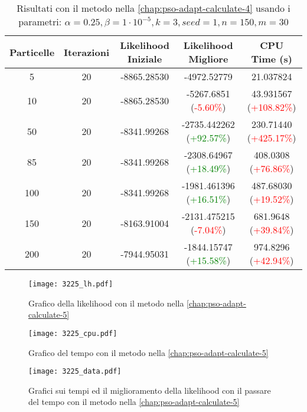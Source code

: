\begin{table}[!h]
  \centering
  \begin{tabular}{*{5}{c}}
    Particelle & Iterazioni & Likelihood Iniziale & Likelihood Migliore & CPU Time (s) \\ \midrule \midrule
    5 & 20 & -8865.28530 & -4972.52779 & 21.037824 \\
    10 & 20 & -8865.28530 & -5267.6851 (\textcolor{red}{-5.60\%}) & 43.931567 (\textcolor{red}{+108.82\%}) \\
    50 & 20 & -8341.99268 & -2735.442262 (\textcolor{green}{+92.57\%}) & 230.71440 (\textcolor{red}{+425.17\%}) \\
    85 & 20 & -8341.99268 & -2308.64967 (\textcolor{green}{+18.49\%}) & 408.0308 (\textcolor{red}{+76.86\%}) \\
    100 & 20 & -8341.99268 & -1981.461396 (\textcolor{green}{+16.51\%}) & 487.68030 (\textcolor{red}{+19.52\%}) \\
    150 & 20 & -8163.91004 & -2131.475215 (\textcolor{red}{-7.04\%}) & 681.9648 (\textcolor{red}{+39.84\%}) \\
    200 & 20 & -7944.95031 & -1844.15747 (\textcolor{green}{+15.58\%}) & 974.8296 (\textcolor{red}{+42.94\%}) \\
  \end{tabular}
  \caption{Risultati con il metodo nella \autoref{chap:pso-adapt-calculate-4} usando i parametri: $\alpha = 0.25, \beta = 1\cdot 10^{-5}, k = 3, seed = 1, n = 150, m = 30$}
  \label{tab:pso-adapt-calculate-5-table}
\end{table}

\begin{figure}[!h]
  \centering
  \begin{minipage}{.45 \textwidth}
  \centering
  \texttt{[image: 3225\_lh.pdf]}
  \caption{Grafico della likelihood con il metodo nella \autoref{chap:pso-adapt-calculate-5}}
  \end{minipage}
  \begin{minipage}{.45 \textwidth}
    \centering
    \texttt{[image: 3225\_cpu.pdf]}
    \caption{Grafico del tempo con il metodo nella \autoref{chap:pso-adapt-calculate-5}}
  \end{minipage}
  \label{fig:pso-adapt-calculate-1-graph}
\end{figure}

\begin{figure}[!h]
  \centering
  \texttt{[image: 3225\_data.pdf]}
  \caption{Grafici sui tempi ed il miglioramento della likelihood con il passare del tempo con il metodo nella \autoref{chap:pso-adapt-calculate-5}}
  \label{fig:pso-adapt-calculate-4-data}
\end{figure}

